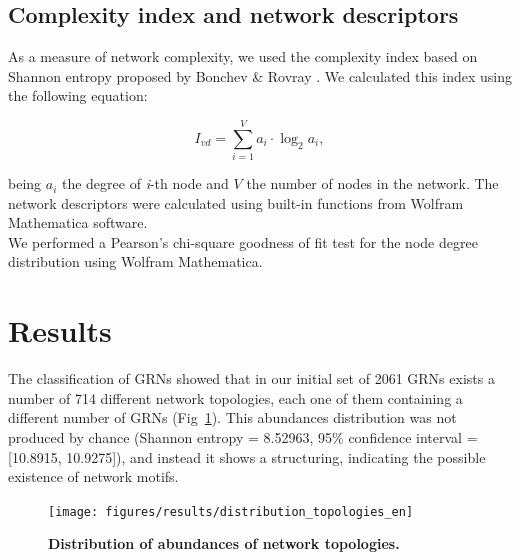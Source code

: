 \documentclass[10pt,letterpaper]{article}
\begin{document}
\subsection*{Complexity index and network descriptors}

As a measure of network complexity, we used the complexity index based on 
Shannon entropy proposed by Bonchev \& Rovray \cite{D.2005}. We calculated this 
index using the following equation:

\begin{equation}
 I_{vd} = \sum_{i=1}^V a_i \cdot \log_{2} a_i,
\end{equation}

being $a_i$ the degree of \emph{i}-th node and $V$ the number of nodes in the 
network. The network descriptors were calculated using built-in functions from 
Wolfram Mathematica software.\\

We performed a Pearson’s chi-square goodness of fit test for the node degree 
distribution using Wolfram Mathematica.



\section*{Results}

The classification of GRNs showed that in our initial set of 2061 GRNs exists a 
number of 714 different network topologies, each one of them containing a 
different number of GRNs (Fig~\ref{fig:distopol}). This abundances distribution 
was not produced by chance (Shannon entropy = 8.52963, 95\% confidence interval 
= [10.8915, 10.9275]), and instead it shows a structuring, indicating the 
possible existence of network motifs.

\begin{figure}[!h]
 \center
 \texttt{[image: figures/results/distribution\_topologies\_en]}
 \caption{\bf Distribution of abundances of network topologies.}
 \label{fig:distopol}
\end{figure}
\end{document}
